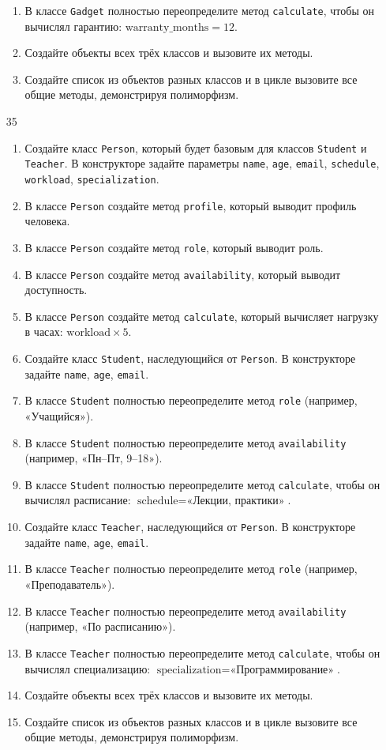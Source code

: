 \begin{enumerate}
\begin{enumerate}[leftmargin=*]
    \item В классе \texttt{Gadget} полностью переопределите метод \texttt{calculate}, чтобы он вычислял гарантию: \( \text{warranty\_months} = 12 \).
    \item Создайте объекты всех трёх классов и вызовите их методы.
    \item Создайте список из объектов разных классов и в цикле вызовите все общие методы, демонстрируя полиморфизм.
\end{enumerate}
\item[35]
\begin{enumerate}[leftmargin=*]
    \item Создайте класс \texttt{Person}, который будет базовым для классов \texttt{Student} и \texttt{Teacher}. В конструкторе задайте параметры \texttt{name}, \texttt{age}, \texttt{email}, \texttt{schedule}, \texttt{workload}, \texttt{specialization}.
    \item В классе \texttt{Person} создайте метод \texttt{profile}, который выводит профиль человека.
    \item В классе \texttt{Person} создайте метод \texttt{role}, который выводит роль.
    \item В классе \texttt{Person} создайте метод \texttt{availability}, который выводит доступность.
    \item В классе \texttt{Person} создайте метод \texttt{calculate}, который вычисляет нагрузку в часах: \( \text{workload} \times 5 \).
    \item Создайте класс \texttt{Student}, наследующийся от \texttt{Person}. В конструкторе задайте \texttt{name}, \texttt{age}, \texttt{email}.
    \item В классе \texttt{Student} полностью переопределите метод \texttt{role} (например, «Учащийся»).
    \item В классе \texttt{Student} полностью переопределите метод \texttt{availability} (например, «Пн–Пт, 9–18»).
    \item В классе \texttt{Student} полностью переопределите метод \texttt{calculate}, чтобы он вычислял расписание: \( \text{schedule} = \text{«Лекции, практики»} \).
    \item Создайте класс \texttt{Teacher}, наследующийся от \texttt{Person}. В конструкторе задайте \texttt{name}, \texttt{age}, \texttt{email}.
    \item В классе \texttt{Teacher} полностью переопределите метод \texttt{role} (например, «Преподаватель»).
    \item В классе \texttt{Teacher} полностью переопределите метод \texttt{availability} (например, «По расписанию»).
    \item В классе \texttt{Teacher} полностью переопределите метод \texttt{calculate}, чтобы он вычислял специализацию: \( \text{specialization} = \text{«Программирование»} \).
    \item Создайте объекты всех трёх классов и вызовите их методы.
    \item Создайте список из объектов разных классов и в цикле вызовите все общие методы, демонстрируя полиморфизм.
\end{enumerate}
\end{enumerate}